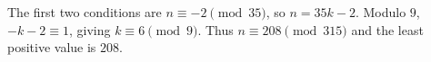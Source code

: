 The first two conditions are $n\equiv-2\pmod{35}$, so $n=35k-2$. Modulo $9$, $-k-2\equiv1$, giving $k\equiv6\pmod9$. Thus $n\equiv208\pmod{315}$ and the least positive value is $\boxed{208}$.
